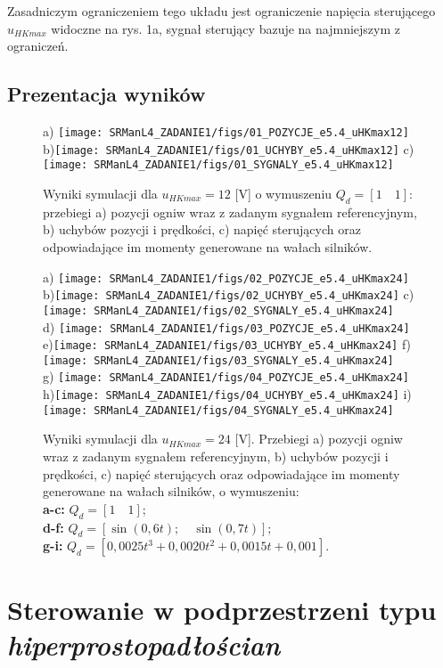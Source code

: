 \documentclass[12pt, a4paper, polish]{article}
\begin{document}
	Zasadniczym ograniczeniem tego układu jest ograniczenie napięcia sterującego $u_{HKmax}$ widoczne na rys. 1a, sygnał sterujący bazuje na najmniejszym z ograniczeń.
\subsection{Prezentacja wyników}
\begin{figure}[h]\centering
		a) \texttt{[image: SRManL4\_ZADANIE1/figs/01\_POZYCJE\_e5.4\_uHKmax12]} b)\texttt{[image: SRManL4\_ZADANIE1/figs/01\_UCHYBY\_e5.4\_uHKmax12]} c)\texttt{[image: SRManL4\_ZADANIE1/figs/01\_SYGNALY\_e5.4\_uHKmax12]}\caption{
			Wyniki symulacji dla $u_{HKmax}=12$ [V] o wymuszeniu $Q_d=[1\quad1]$: przebiegi a) pozycji ogniw wraz z zadanym sygnałem referencyjnym, b) uchybów pozycji i prędkości, c)  napięć sterujących oraz odpowiadające im momenty generowane na wałach silników.}
\end{figure}
\begin{figure}[!ht]\centering
	a) \texttt{[image: SRManL4\_ZADANIE1/figs/02\_POZYCJE\_e5.4\_uHKmax24]} b)\texttt{[image: SRManL4\_ZADANIE1/figs/02\_UCHYBY\_e5.4\_uHKmax24]} c)\texttt{[image: SRManL4\_ZADANIE1/figs/02\_SYGNALY\_e5.4\_uHKmax24]}\\
	d) \texttt{[image: SRManL4\_ZADANIE1/figs/03\_POZYCJE\_e5.4\_uHKmax24]} e)\texttt{[image: SRManL4\_ZADANIE1/figs/03\_UCHYBY\_e5.4\_uHKmax24]} f)\texttt{[image: SRManL4\_ZADANIE1/figs/03\_SYGNALY\_e5.4\_uHKmax24]}\\
	g) \texttt{[image: SRManL4\_ZADANIE1/figs/04\_POZYCJE\_e5.4\_uHKmax24]} h)\texttt{[image: SRManL4\_ZADANIE1/figs/04\_UCHYBY\_e5.4\_uHKmax24]} i)\texttt{[image: SRManL4\_ZADANIE1/figs/04\_SYGNALY\_e5.4\_uHKmax24]}\caption{
		Wyniki symulacji dla $u_{HKmax}=24$ [V]. Przebiegi a) pozycji ogniw wraz z zadanym sygnałem referencyjnym, b) uchybów pozycji i prędkości, c)  napięć sterujących oraz odpowiadające im momenty generowane na wałach silników, o wymuszeniu:\\
		 \textbf{a-c:} $Q_d=[1\quad1]$;\\
		 \textbf{d-f:} $Q_d=[\sin(0,6t);\quad \sin(0,7t)]$;\\
		 \textbf{g-i:} $Q_d=[0,0025t^3+0,0020t^2+0,0015t+0,001]$.}
\end{figure}

\section{Sterowanie w podprzestrzeni typu \textit{hiperprostopadłościan}}
\end{document}
